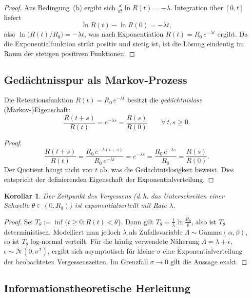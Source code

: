 ﻿\documentclass[12pt,a4paper,twoside]{article}
\theoremstyle{theormstyle}
\newtheorem{corollary}[theorem]{Korollar}
\theoremstyle{proofstyle}
\begin{document}
	\begin{proof}
		Aus Bedingung~(b) ergibt sich $\frac{d}{dt}\ln R(t) = -\lambda$.
		Integration über $[0,t]$ liefert
		\[
		\ln R(t) - \ln R(0) = -\lambda t,
		\]
		also $\ln\bigl(R(t)/R_0\bigr) = -\lambda t$,
		was nach Exponentiation
		$R(t) = R_0\,e^{-\lambda t}$
		ergibt. Da die Exponentialfunktion strikt positiv und stetig ist, ist
		die Lösung eindeutig im Raum der stetigen positiven Funktionen.
	\end{proof}
	
	\subsection{Gedächtnisspur als Markov-Prozess}
	
		Die Retentionsfunktion $R(t) = R_0\,e^{-\lambda t}$ besitzt die
		\emph{gedächtnislose} (Markov-)Eigenschaft:
		\[
		\frac{R(t+s)}{R(t)} = e^{-\lambda s} = \frac{R(s)}{R(0)} \qquad \forall\, t,s \geq 0.
		\]
	
	\begin{proof}
		\[
		\frac{R(t+s)}{R(t)} = \frac{R_0\,e^{-\lambda(t+s)}}{R_0\,e^{-\lambda t}}
		= e^{-\lambda s} = \frac{R_0\,e^{-\lambda s}}{R_0} = \frac{R(s)}{R(0)}.
		\]
		Der Quotient hängt nicht von $t$ ab, was die Gedächtnislosigkeit beweist.
		Dies entspricht der definierenden Eigenschaft der Exponentialverteilung.
	\end{proof}
	
	\begin{corollary}
		Der Zeitpunkt des Vergessens (d.\,h. das Unterschreiten einer Schwelle
		$\theta \in (0,R_0)$) ist exponentialverteilt mit Rate $\lambda$.
	\end{corollary}
	
	\begin{proof}
		Sei $T_\theta := \inf\{t \geq 0 : R(t) < \theta\}$.
		Dann gilt $T_\theta = \frac{1}{\lambda}\ln\frac{R_0}{\theta}$, also ist
		$T_\theta$ deterministisch. Modelliert man jedoch $\lambda$ als
		Zufallsvariable $\Lambda \sim \mathrm{Gamma}(\alpha,\beta)$, so ist
		$T_\theta$ log-normal verteilt. Für die häufig verwendete Näherung
		$\Lambda = \lambda + \epsilon$, $\epsilon \sim \mathcal{N}(0,\sigma^2)$,
		ergibt sich asymptotisch für kleine $\sigma$ eine Exponentialverteilung
		der beobachteten Vergessenszeiten. Im Grenzfall $\sigma \to 0$ gilt die Aussage
		exakt.
	\end{proof}
	
	\subsection{Informationstheoretische Herleitung}
	
\end{document}
